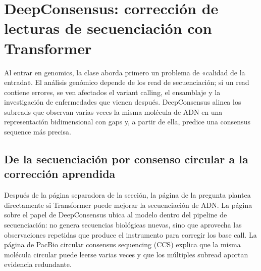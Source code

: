 \section{DeepConsensus: corrección de lecturas de secuenciación con Transformer}

Al entrar en genomics, la clase aborda primero un problema de «calidad de la entrada». El análisis genómico depende de los read de secuenciación; si un read contiene errores, se ven afectados el variant calling, el ensamblaje y la investigación de enfermedades que vienen después. DeepConsensus alinea los subreads que observan varias veces la misma molécula de ADN en una representación bidimensional con gaps y, a partir de ella, predice una consensus sequence más precisa.

\subsection{De la secuenciación por consenso circular a la corrección aprendida}

Después de la página separadora de la sección, la página de la pregunta plantea directamente si Transformer puede mejorar la secuenciación de ADN. La página sobre el papel de DeepConsensus ubica al modelo dentro del pipeline de secuenciación: no genera secuencias biológicas nuevas, sino que aprovecha las observaciones repetidas que produce el instrumento para corregir los base call. La página de PacBio circular consensus sequencing (CCS) explica que la misma molécula circular puede leerse varias veces y que los múltiples subread aportan evidencia redundante.





